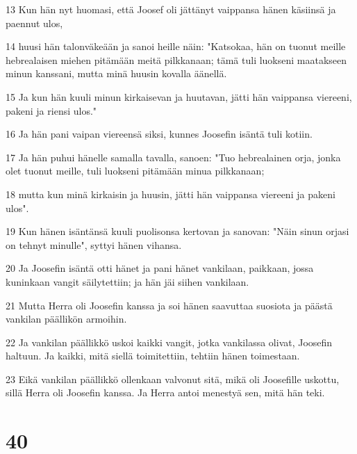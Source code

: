 \par 13 Kun hän nyt huomasi, että Joosef oli jättänyt vaippansa hänen käsiinsä ja paennut ulos,
\par 14 huusi hän talonväkeään ja sanoi heille näin: "Katsokaa, hän on tuonut meille hebrealaisen miehen pitämään meitä pilkkanaan; tämä tuli luokseni maatakseen minun kanssani, mutta minä huusin kovalla äänellä.
\par 15 Ja kun hän kuuli minun kirkaisevan ja huutavan, jätti hän vaippansa viereeni, pakeni ja riensi ulos."
\par 16 Ja hän pani vaipan viereensä siksi, kunnes Joosefin isäntä tuli kotiin.
\par 17 Ja hän puhui hänelle samalla tavalla, sanoen: "Tuo hebrealainen orja, jonka olet tuonut meille, tuli luokseni pitämään minua pilkkanaan;
\par 18 mutta kun minä kirkaisin ja huusin, jätti hän vaippansa viereeni ja pakeni ulos".
\par 19 Kun hänen isäntänsä kuuli puolisonsa kertovan ja sanovan: "Näin sinun orjasi on tehnyt minulle", syttyi hänen vihansa.
\par 20 Ja Joosefin isäntä otti hänet ja pani hänet vankilaan, paikkaan, jossa kuninkaan vangit säilytettiin; ja hän jäi siihen vankilaan.
\par 21 Mutta Herra oli Joosefin kanssa ja soi hänen saavuttaa suosiota ja päästä vankilan päällikön armoihin.
\par 22 Ja vankilan päällikkö uskoi kaikki vangit, jotka vankilassa olivat, Joosefin haltuun. Ja kaikki, mitä siellä toimitettiin, tehtiin hänen toimestaan.
\par 23 Eikä vankilan päällikkö ollenkaan valvonut sitä, mikä oli Joosefille uskottu, sillä Herra oli Joosefin kanssa. Ja Herra antoi menestyä sen, mitä hän teki.

\chapter{40}

